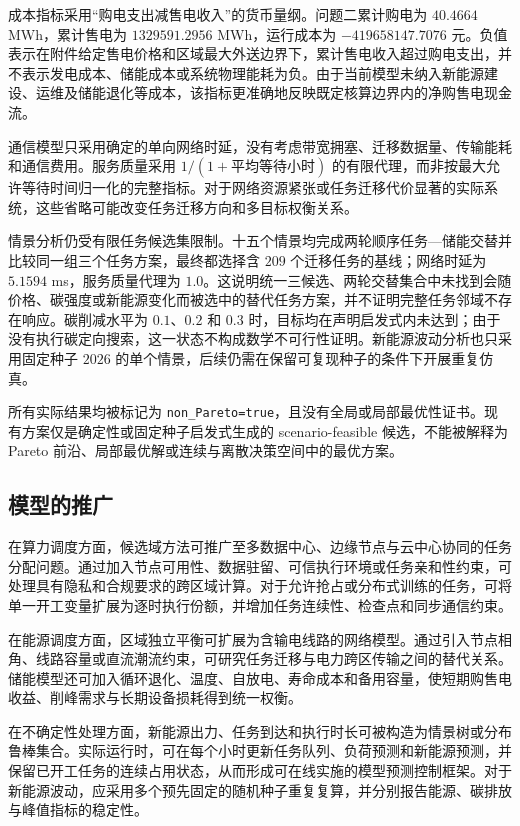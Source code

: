 \documentclass[withoutpreface,bwprint]{cumcmthesis}
\begin{document}
成本指标采用“购电支出减售电收入”的货币量纲。问题二累计购电为 $40.4664$ MWh，累计售电为 $1329591.2956$ MWh，运行成本为 $-419658147.7076$ 元。负值表示在附件给定售电价格和区域最大外送边界下，累计售电收入超过购电支出，并不表示发电成本、储能成本或系统物理能耗为负。由于当前模型未纳入新能源建设、运维及储能退化等成本，该指标更准确地反映既定核算边界内的净购售电现金流。

通信模型只采用确定的单向网络时延，没有考虑带宽拥塞、迁移数据量、传输能耗和通信费用。服务质量采用 $1/(1+\text{平均等待小时})$ 的有限代理，而非按最大允许等待时间归一化的完整指标。对于网络资源紧张或任务迁移代价显著的实际系统，这些省略可能改变任务迁移方向和多目标权衡关系。

情景分析仍受有限任务候选集限制。十五个情景均完成两轮顺序任务—储能交替并比较同一组三个任务方案，最终都选择含 $209$ 个迁移任务的基线；网络时延为 $5.1594$ ms，服务质量代理为 $1.0$。这说明统一三候选、两轮交替集合中未找到会随价格、碳强度或新能源变化而被选中的替代任务方案，并不证明完整任务邻域不存在响应。碳削减水平为 $0.1$、$0.2$ 和 $0.3$ 时，目标均在声明启发式内未达到；由于没有执行碳定向搜索，这一状态不构成数学不可行性证明。新能源波动分析也只采用固定种子 $2026$ 的单个情景，后续仍需在保留可复现种子的条件下开展重复仿真。

所有实际结果均被标记为 \texttt{non\_Pareto=true}，且没有全局或局部最优性证书。现有方案仅是确定性或固定种子启发式生成的 scenario-feasible 候选，不能被解释为 Pareto 前沿、局部最优解或连续与离散决策空间中的最优方案。

\subsection{模型的推广}

在算力调度方面，候选域方法可推广至多数据中心、边缘节点与云中心协同的任务分配问题。通过加入节点可用性、数据驻留、可信执行环境或任务亲和性约束，可处理具有隐私和合规要求的跨区域计算。对于允许抢占或分布式训练的任务，可将单一开工变量扩展为逐时执行份额，并增加任务连续性、检查点和同步通信约束。

在能源调度方面，区域独立平衡可扩展为含输电线路的网络模型。通过引入节点相角、线路容量或直流潮流约束，可研究任务迁移与电力跨区传输之间的替代关系。储能模型还可加入循环退化、温度、自放电、寿命成本和备用容量，使短期购售电收益、削峰需求与长期设备损耗得到统一权衡。

在不确定性处理方面，新能源出力、任务到达和执行时长可被构造为情景树或分布鲁棒集合。实际运行时，可在每个小时更新任务队列、负荷预测和新能源预测，并保留已开工任务的连续占用状态，从而形成可在线实施的模型预测控制框架\cite{rawlings2017model}。对于新能源波动，应采用多个预先固定的随机种子重复复算，并分别报告能源、碳排放与峰值指标的稳定性。
\end{document}
